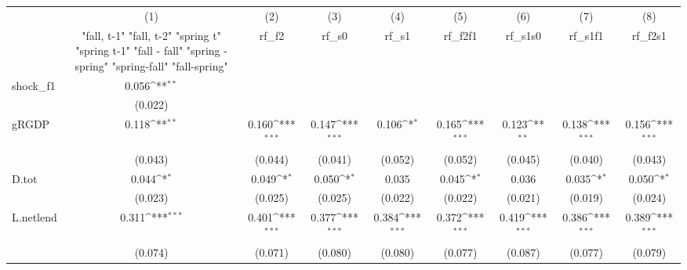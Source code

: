 {
\def\sym#1{\ifmmode^{#1}\else\(^{#1}\)\fi}
\begin{tabular}{l*{8}{c}}
\toprule
            &\multicolumn{1}{c}{(1)}&\multicolumn{1}{c}{(2)}&\multicolumn{1}{c}{(3)}&\multicolumn{1}{c}{(4)}&\multicolumn{1}{c}{(5)}&\multicolumn{1}{c}{(6)}&\multicolumn{1}{c}{(7)}&\multicolumn{1}{c}{(8)}\\
            &\multicolumn{1}{c}{  "fall, t-1" "fall, t-2" "spring t" "spring t-1"  "fall - fall" "spring - spring" "spring-fall" "fall-spring" }&\multicolumn{1}{c}{rf\_f2}&\multicolumn{1}{c}{rf\_s0}&\multicolumn{1}{c}{rf\_s1}&\multicolumn{1}{c}{rf\_f2f1}&\multicolumn{1}{c}{rf\_s1s0}&\multicolumn{1}{c}{rf\_s1f1}&\multicolumn{1}{c}{rf\_f2s1}\\
\midrule
shock\_f1    &       0.056\sym{**} &                     &                     &                     &                     &                     &                     &                     \\
            &     (0.022)         &                     &                     &                     &                     &                     &                     &                     \\
\addlinespace
gRGDP       &       0.118\sym{**} &       0.160\sym{***}&       0.147\sym{***}&       0.106\sym{*}  &       0.165\sym{***}&       0.123\sym{**} &       0.138\sym{***}&       0.156\sym{***}\\
            &     (0.043)         &     (0.044)         &     (0.041)         &     (0.052)         &     (0.052)         &     (0.045)         &     (0.040)         &     (0.043)         \\
\addlinespace
D.tot       &       0.044\sym{*}  &       0.049\sym{*}  &       0.050\sym{*}  &       0.035         &       0.045\sym{*}  &       0.036         &       0.035\sym{*}  &       0.050\sym{*}  \\
            &     (0.023)         &     (0.025)         &     (0.025)         &     (0.022)         &     (0.022)         &     (0.021)         &     (0.019)         &     (0.024)         \\
\addlinespace
L.netlend   &       0.311\sym{***}&       0.401\sym{***}&       0.377\sym{***}&       0.384\sym{***}&       0.372\sym{***}&       0.419\sym{***}&       0.386\sym{***}&       0.389\sym{***}\\
            &     (0.074)         &     (0.071)         &     (0.080)         &     (0.080)         &     (0.077)         &     (0.087)         &     (0.077)         &     (0.079)         \\

\end{tabular}}
